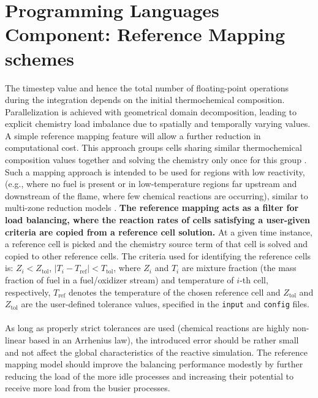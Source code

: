 \documentclass{homework}
\begin{document}
\section{\textbf{Programming Languages Component: Reference Mapping schemes}}
\noindent The timestep value and hence the total number of floating-point operations during the integration depends on the initial thermochemical composition. Parallelization is achieved with geometrical domain decomposition, leading to explicit chemistry load imbalance due to spatially and temporally varying values. A simple reference mapping feature will allow a further reduction in computational cost. This approach groups cells sharing similar thermochemical composition values together and solving the chemistry only once for this group \cite{DLBFoam_1}. Such a mapping approach is intended to be used for regions with low reactivity, (e.g., where no fuel is present or in low-temperature regions far upstream and downstream of the flame, where few chemical reactions are occurring), similar to multi-zone reduction models \cite{Zonal}. \textbf{The reference mapping acts as a filter for load balancing, where the reaction rates of cells satisfying a user-given criteria are copied from a reference cell solution.} At a given time instance, a reference cell is picked and the chemistry source term of that cell is solved and copied to other reference cells. The criteria used for identifying the reference cells is: $Z_i < Z_\textrm{tol}$, $|T_i - T_\textrm{ref} | < T_\textrm{tol}$, where $Z_i$ and $T_i$ are mixture fraction (the mass fraction of fuel in a fuel/oxidizer stream) and temperature of $i$-th cell, respectively, $T_\textrm{ref}$ denotes the temperature of the chosen reference cell and $Z_\textrm{tol}$ and $Z_\textrm{tol}$ are the user-defined tolerance values, specified in the \texttt{input} and \texttt{config} files. 
\\ \\ \noindent
As long as properly strict tolerances are used (chemical reactions are highly non-linear based in an Arrhenius law), the introduced error should be rather small and not affect the global characteristics of the reactive simulation. The reference mapping model should improve the balancing performance modestly by further reducing the load of the more idle processes and increasing their potential to receive more load from the busier processes.
\end{document}
